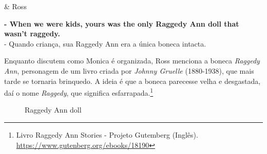 \begin{tcolorbox}[enhanced,center upper,
    drop fuzzy shadow southeast, boxrule=0.3pt,
    lower separated=false, breakable,
    colframe=black!30!dialogoBorder,colback=white]
\begin{minipage}[c]{0.16\linewidth}
   & \centering \scriptsize{Ross}
\end{minipage}
\hfill
\begin{minipage}[c]{0.8\linewidth}
  \textbf{- When we were kids, yours was the only Raggedy Ann doll that wasn't raggedy.}\\
  - Quando criança, sua Raggedy Ann era a única boneca intacta.
\end{minipage}
\end{tcolorbox}

\saveparinfos
\noindent
\begin{minipage}[c]{0.5\textwidth}\useparinfo

Enquanto discutem como Monica é organizada, Ross menciona a boneca
\emph{Raggedy Ann}, personagem de um livro criada por \emph{Johnny
Gruelle} (1880-1938), que mais tarde se tornaria brinquedo. A ideia é
que a boneca parecesse velha e desgastada, daí o nome \emph{Raggedy},
que significa esfarrapada.\footnote{\sloppy Livro Raggedy Ann Stories - Projeto Gutemberg (Inglês). \url{https://www.gutenberg.org/ebooks/18190}}

\end{minipage}\hfill
\begin{minipage}[c]{0.5\textwidth}

\begin{figure}
  \centering
    \caption{Raggedy Ann doll\label{fig:raggedy-ann-doll}}
\end{figure}

\end{minipage}

